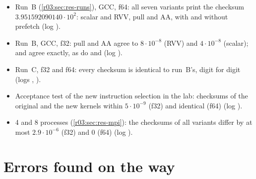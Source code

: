 \begin{itemize}
  \item Run~B (\cref{r03:sec:res-runs}), GCC, f64: all seven variants print the checksum
        $3.951592090140\cdot10^{2}$: scalar and RVV, pull and AA, with and without prefetch (log
        ).
  \item Run~B, GCC, f32: pull and AA agree to $8\cdot10^{-8}$ (RVV) and $4\cdot10^{-8}$ (scalar);
         and  agree exactly, as do
         and  (log ).
  \item Run~C, f32 and f64: every checksum is identical to run~B's, digit for digit (logs
        , ).
  \item Acceptance test of the new instruction selection in the lab: checksums of the original
        and the new kernels within $5\cdot10^{-9}$ (f32) and identical (f64) (log
        ).
  \item 4 and 8 processes (\cref{r03:sec:res-mpi}): the checksums of all variants differ by at
        most $2.9\cdot10^{-6}$ (f32) and 0 (f64) (log ).
\end{itemize}

\section{Errors found on the way}\label{r03:sec:ver-bugs}

